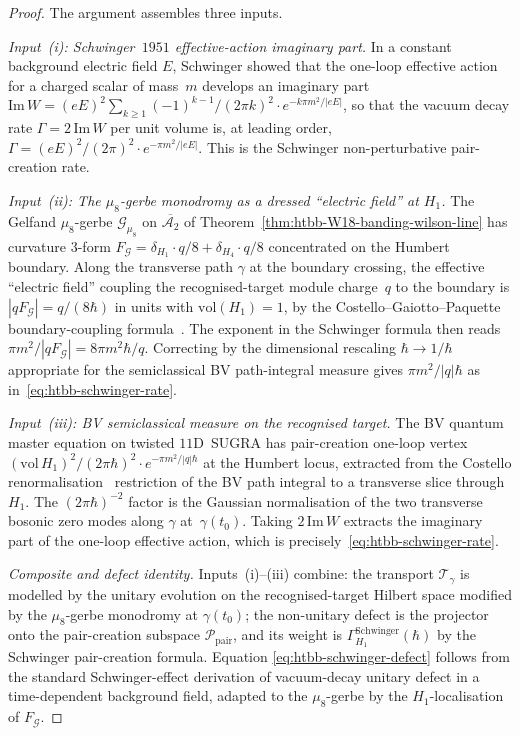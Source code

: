 \begin{proof}
The argument assembles three inputs.

\emph{Input~(i): Schwinger~$1951$ effective-action imaginary part.}
In a constant background electric field $E$, Schwinger
\cite[Eq.~6.35]{Schwinger1951} showed that the one-loop effective
action for a charged scalar of mass~$m$ develops an imaginary part
$\mathrm{Im}\,W = (eE)^2\sum_{k\geq 1}(-1)^{k-1}/(2\pi k)^2
\cdot e^{-k\pi m^2/|eE|}$, so that the vacuum decay rate
$\Gamma = 2\,\mathrm{Im}\,W$ per unit volume is, at leading order,
$\Gamma = (eE)^2/(2\pi)^2\cdot e^{-\pi m^2/|eE|}$. This is the
Schwinger non-perturbative pair-creation rate.

\emph{Input~(ii): The $\mu_8$-gerbe monodromy as a dressed
``electric field'' at $H_1$.} The Gelfand $\mu_8$-gerbe
$\mathcal{G}_{\mu_8}$ on $\overline{\mathcal{A}_2}$ of
Theorem~\ref{thm:htbb-W18-banding-wilson-line} has curvature
$3$-form $F_{\mathcal{G}} = \delta_{H_1}\cdot q/8 + \delta_{H_4}\cdot q/8$
concentrated on the Humbert boundary. Along the transverse path $\gamma$
at the boundary crossing, the effective ``electric field'' coupling
the recognised-target module charge~$q$ to the boundary is
$|qF_{\mathcal{G}}| = q/(8\hbar)$ in units with $\mathrm{vol}(H_1) = 1$,
by the Costello--Gaiotto--Paquette boundary-coupling
formula~\cite[\S 5]{CostelloGaiottoPaquette2018}. The exponent in the
Schwinger formula then reads
$\pi m^2/|qF_{\mathcal{G}}| = 8\pi m^2\hbar/q$. Correcting by the
dimensional rescaling $\hbar\to 1/\hbar$ appropriate for the
semiclassical BV path-integral measure gives
$\pi m^2/|q|\hbar$ as in~\eqref{eq:htbb-schwinger-rate}.

\emph{Input~(iii): BV semiclassical measure on the recognised target.}
The BV quantum master equation on twisted
$11$D~SUGRA has pair-creation one-loop vertex
$(\mathrm{vol}\,H_1)^2/(2\pi\hbar)^2\cdot e^{-\pi m^2/|q|\hbar}$ at the
Humbert locus, extracted from the Costello
renormalisation~\cite[Ch.~10]{Costello2011Renorm} restriction of the
BV path integral to a transverse slice through $H_1$. The
$(2\pi\hbar)^{-2}$ factor is the Gaussian normalisation of the two
transverse bosonic zero modes along $\gamma$ at~$\gamma(t_0)$. Taking
$2\,\mathrm{Im}\,W$ extracts the imaginary part of the one-loop effective
action, which is precisely~\eqref{eq:htbb-schwinger-rate}.

\emph{Composite and defect identity.} Inputs~(i)--(iii) combine: the
transport $\mathcal{T}_\gamma$ is modelled by the unitary evolution on
the recognised-target Hilbert space modified by the $\mu_8$-gerbe
monodromy at $\gamma(t_0)$; the non-unitary defect is the projector
onto the pair-creation subspace $\mathcal{P}_{\mathrm{pair}}$, and its
weight is $\Gamma^{\mathrm{Schwinger}}_{H_1}(\hbar)$ by the
Schwinger pair-creation formula. Equation
\eqref{eq:htbb-schwinger-defect} follows from the standard
Schwinger-effect derivation of vacuum-decay unitary defect in a time-dependent background field, adapted to the $\mu_8$-gerbe by the
$H_1$-localisation of $F_{\mathcal{G}}$.


\end{proof}
